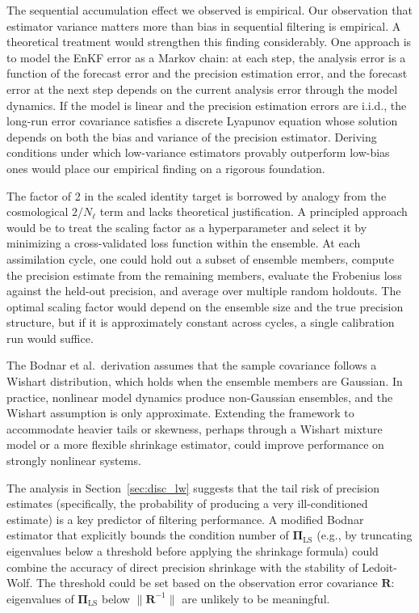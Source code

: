 The sequential accumulation effect we observed is empirical. Our observation that estimator variance matters more than bias in sequential filtering is empirical. A theoretical treatment would strengthen this finding considerably. One approach is to model the EnKF error as a Markov chain: at each step, the analysis error is a function of the forecast error and the precision estimation error, and the forecast error at the next step depends on the current analysis error through the model dynamics. If the model is linear and the precision estimation errors are i.i.d., the long-run error covariance satisfies a discrete Lyapunov equation whose solution depends on both the bias and variance of the precision estimator. Deriving conditions under which low-variance estimators provably outperform low-bias ones would place our empirical finding on a rigorous foundation.

The factor of 2 in the scaled identity target is borrowed by analogy from the cosmological $2/N_\ell$ term and lacks theoretical justification. A principled approach would be to treat the scaling factor as a hyperparameter and select it by minimizing a cross-validated loss function within the ensemble. At each assimilation cycle, one could hold out a subset of ensemble members, compute the precision estimate from the remaining members, evaluate the Frobenius loss against the held-out precision, and average over multiple random holdouts. The optimal scaling factor would depend on the ensemble size and the true precision structure, but if it is approximately constant across cycles, a single calibration run would suffice.

The Bodnar et al.\ derivation assumes that the sample covariance follows a Wishart distribution, which holds when the ensemble members are Gaussian. In practice, nonlinear model dynamics produce non-Gaussian ensembles, and the Wishart assumption is only approximate. Extending the framework to accommodate heavier tails or skewness, perhaps through a Wishart mixture model or a more flexible shrinkage estimator, could improve performance on strongly nonlinear systems.

The analysis in Section~\ref{sec:disc_lw} suggests that the tail risk of precision estimates (specifically, the probability of producing a very ill-conditioned estimate) is a key predictor of filtering performance. A modified Bodnar estimator that explicitly bounds the condition number of $\boldsymbol{\Pi}_{\text{LS}}$ (e.g., by truncating eigenvalues below a threshold before applying the shrinkage formula) could combine the accuracy of direct precision shrinkage with the stability of Ledoit-Wolf. The threshold could be set based on the observation error covariance $\mathbf{R}$: eigenvalues of $\boldsymbol{\Pi}_{\text{LS}}$ below $\|\mathbf{R}^{-1}\|$ are unlikely to be meaningful.

